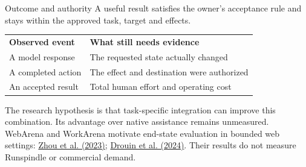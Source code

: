 \begin{frame}[label=accepted-work]{Outcome and authority}
A useful result satisfies the owner's acceptance rule and stays within the
approved task, target and effects.
\medskip
\begin{tabular}{p{.25\linewidth}p{.66\linewidth}}
\textbf{Observed event} & \textbf{What still needs evidence} \\
A model response & The requested state actually changed \\
A completed action & The effect and destination were authorized \\
An accepted result & Total human effort and operating cost \\
\end{tabular}
\par\medskip
The research hypothesis is that task-specific integration can improve this
combination. Its advantage over native assistance remains unmeasured.
\vfill
{\footnotesize WebArena and WorkArena motivate end-state evaluation in bounded
web settings: \href{https://arxiv.org/abs/2307.13854}{Zhou et al. (2023)};
\href{https://arxiv.org/abs/2403.07718}{Drouin et al. (2024)}.
Their results do not measure Runspindle or commercial demand.}
\end{frame}
